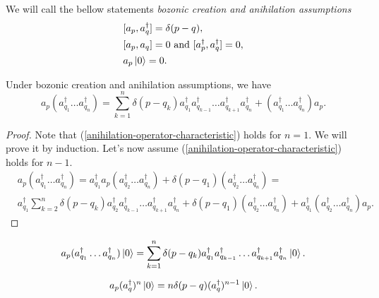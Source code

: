 \documentclass[main.tex]{subfiles}
\begin{document}
\begin{definition}
We will call the bellow statements \textit{bozonic creation and anihilation assumptions}
\begin{align}
& [a_p, a^\dagger_q] = \delta(p - q),\\
& [a_p, a_q] = 0 \text{ and } [a^\dagger_p, a^\dagger_q] = 0,\\
& a_p\ket{0} = 0.
\end{align}
\end{definition}

\begin{proposition}
Under bozonic creation and anihilation assumptions, we have
\begin{equation}
\label{anihilation-operator-characteristic}
a_p (a_{q_1}^\dagger \dots a_{q_n}^\dagger) = \sum_{k=1}^n\delta(p - q_k) a_{q_1}^\dagger a_{q_{k - 1}}^\dagger \dots a_{q_{k + 1}}^\dagger a_{q_n}^\dagger + (a_{q_1}^\dagger \dots a_{q_n}^\dagger)a_p.
\end{equation}
\end{proposition}
\begin{proof}
Note that (\ref{anihilation-operator-characteristic}) holds for $n = 1$. We will prove it by induction. Let's now assume (\ref{anihilation-operator-characteristic}) holds for $n - 1$.
\begin{align*}
& a_p (a_{q_1}^\dagger \dots a_{q_n}^\dagger)=
a_{q_1}^\dagger a_p (a_{q_2}^\dagger \dots a_{q_n}^\dagger) + \delta(p - q_1) (a_{q_2}^\dagger \dots a_{q_n}^\dagger)= \\
& a_{q_1}^\dagger\sum_{k=2}^n\delta(p - q_k) a_{q_2}^\dagger a_{q_{k - 1}}^\dagger \dots a_{q_{k + 1}}^\dagger a_{q_n}^\dagger + \delta(p - q_1) (a_{q_2}^\dagger \dots a_{q_n}^\dagger) + a_{q_1}^\dagger (a_{q_2}^\dagger \dots a_{q_n}^\dagger)a_p.
\end{align*} 
\end{proof}

\begin{corollary}
\begin{equation}
a_p (a_{q_1}^\dagger \dots a_{q_n}^\dagger) \ket{0} = \sum_{k=1}^n\delta(p - q_k) a_{q_1}^\dagger a_{q_{k - 1}}^\dagger \dots a_{q_{k + 1}}^\dagger a_{q_n}^\dagger \ket{0}.
\end{equation}
\end{corollary}

\begin{corollary}
\begin{equation}
a_p (a_{q}^\dagger)^n \ket{0} = n \delta(p - q) (a_{q}^\dagger)^{n-1} \ket{0}.
\end{equation}
\end{corollary}
\end{document}
